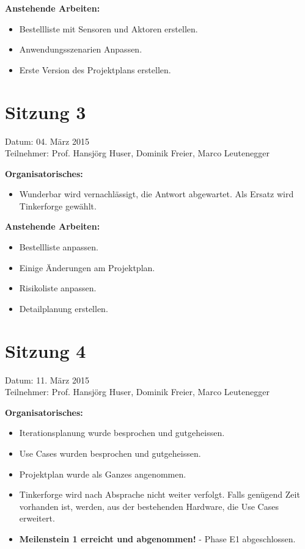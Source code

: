 	\textbf{Anstehende Arbeiten:}
	\begin{itemize}
		\item Bestellliste mit Sensoren und Aktoren erstellen.
		\item Anwendungsszenarien Anpassen.
		\item Erste Version des Projektplans erstellen.
	\end{itemize}

\section*{Sitzung 3}
	Datum: 04. März 2015 \\
	Teilnehmer: Prof. Hansjörg Huser, Dominik Freier, Marco Leutenegger

	\textbf{Organisatorisches:}
	\begin{itemize}
		\item Wunderbar wird vernachlässigt, die Antwort abgewartet. Als Ersatz wird Tinkerforge gewählt.
	\end{itemize}

	\textbf{Anstehende Arbeiten:}
	\begin{itemize}
		\item Bestellliste anpassen.
		\item Einige Änderungen am Projektplan.
		\item Risikoliste anpassen.
		\item Detailplanung erstellen.
	\end{itemize}
	
\section*{Sitzung 4}
	Datum: 11. März 2015 \\
	Teilnehmer: Prof. Hansjörg Huser, Dominik Freier, Marco Leutenegger

	\textbf{Organisatorisches:}
	\begin{itemize}
		\item Iterationsplanung wurde besprochen und gutgeheissen.
		\item Use Cases wurden besprochen und gutgeheissen.
		\item Projektplan wurde als Ganzes angenommen.
		\item Tinkerforge wird nach Absprache nicht weiter verfolgt. Falls genügend Zeit vorhanden ist, werden, aus der bestehenden Hardware, die Use Cases erweitert.
		\item \textbf{Meilenstein 1 erreicht und abgenommen!} - Phase E1 abgeschlossen.
	\end{itemize}

